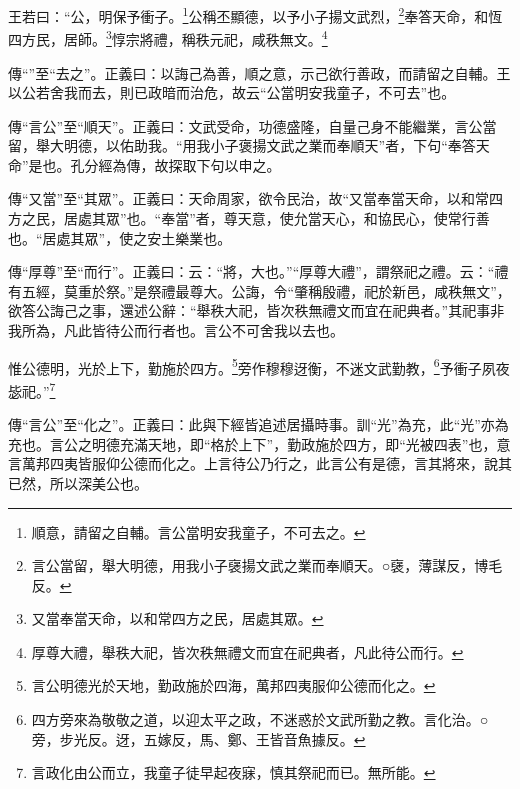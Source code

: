 王若曰：“公，明保予衝子。\footnote{順意，請留之自輔。言公當明安我童子，不可去之。}公稱丕顯德，以予小子揚文武烈，\footnote{言公當留，舉大明德，用我小子襃揚文武之業而奉順天。○襃，薄謀反，博毛反。}奉答天命，和恆四方民，居師。\footnote{又當奉當天命，以和常四方之民，居處其眾。}惇宗將禮，稱秩元祀，咸秩無文。\footnote{厚尊大禮，舉秩大祀，皆次秩無禮文而宜在祀典者，凡此待公而行。}


{\noindent\zhuan{}\fzbyks 傳“”至“去之”。正義曰：以誨己為善，順之意，示己欲行善政，而請留之自輔。王以公若舍我而去，則已政暗而治危，故云“公當明安我童子，不可去”也。 \par}

{\noindent\zhuan{}\fzbyks 傳“言公”至“順天”。正義曰：文武受命，功德盛隆，自量己身不能繼業，言公當留，舉大明德，以佑助我。“用我小子褒揚文武之業而奉順天”者，下句“奉答天命”是也。孔分經為傳，故探取下句以申之。 \par}

{\noindent\zhuan{}\fzbyks 傳“又當”至“其眾”。正義曰：天命周家，欲令民治，故“又當奉當天命，以和常四方之民，居處其眾”也。“奉當”者，尊天意，使允當天心，和協民心，使常行善也。“居處其眾”，使之安土樂業也。 \par}

{\noindent\zhuan{}\fzbyks 傳“厚尊”至“而行”。正義曰：云：“將，大也。”“厚尊大禮”，謂祭祀之禮。云：“禮有五經，莫重於祭。”是祭禮最尊大。公誨，令“肇稱殷禮，祀於新邑，咸秩無文”，欲答公誨己之事，還述公辭：“舉秩大祀，皆次秩無禮文而宜在祀典者。”其祀事非我所為，凡此皆待公而行者也。言公不可舍我以去也。 \par}

惟公德明，光於上下，勤施於四方。\footnote{言公明德光於天地，勤政施於四海，萬邦四夷服仰公德而化之。}旁作穆穆迓衡，不迷文武勤教，\footnote{四方旁來為敬敬之道，以迎太平之政，不迷惑於文武所勤之教。言化治。○旁，步光反。迓，五嫁反，馬、鄭、王皆音魚據反。}予衝子夙夜毖祀。”\footnote{言政化由公而立，我童子徒早起夜寐，慎其祭祀而已。無所能。}

{\noindent\zhuan{}\fzbyks 傳“言公”至“化之”。正義曰：此與下經皆追述居攝時事。訓“光”為充，此“光”亦為充也。言公之明德充滿天地，即“格於上下”，勤政施於四方，即“光被四表”也，意言萬邦四夷皆服仰公德而化之。上言待公乃行之，此言公有是德，言其將來，說其已然，所以深美公也。 \par}

